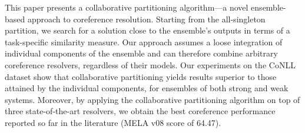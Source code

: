 This paper presents a collaborative partitioning algorithm---a novel ensemble-based approach to coreference resolution. Starting from the all-singleton partition, we search for a solution close to the ensemble's outputs in terms of a task-specific similarity measure. Our approach assumes a loose integration of individual components of the ensemble and can therefore combine arbitrary coreference resolvers, regardless of their models. Our experiments on the CoNLL dataset show that collaborative partitioning yields results superior to those attained by the individual components, for ensembles of both strong and weak systems. Moreover, by applying the collaborative partitioning algorithm on top of three state-of-the-art resolvers, we obtain the best coreference performance reported so far in the literature (MELA v08 score of 64.47).

